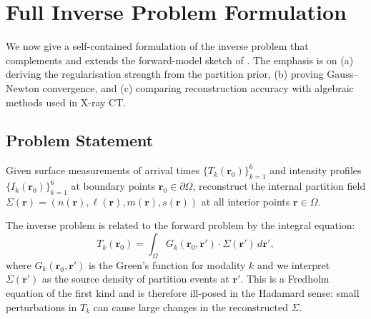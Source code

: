 \section{Full Inverse Problem Formulation}
\label{sec:ch06-inverse-problem}

We now give a self-contained formulation of the inverse problem that
complements and extends the forward-model sketch of .
The emphasis is on (a) deriving the regularisation strength from the partition
prior, (b) proving Gauss--Newton convergence, and (c) comparing reconstruction
accuracy with algebraic methods used in X-ray CT.

\subsection{Problem Statement}
\label{sec:ch06-inverse-statement}

\begin{definition}
\label{def:ch06-inverse-problem}
Given surface measurements of arrival times $\{T_k(\mathbf{r}_0)\}_{k=1}^6$
and intensity profiles $\{I_k(\mathbf{r}_0)\}_{k=1}^6$ at boundary points
$\mathbf{r}_0 \in \partial\Omega$, reconstruct the internal partition field
$\Sigma(\mathbf{r}) = (n(\mathbf{r}), \ell(\mathbf{r}), m(\mathbf{r}),
s(\mathbf{r}))$ at all interior points $\mathbf{r} \in \Omega$.
\end{definition}

The inverse problem is related to the forward problem by the integral equation:
\begin{equation}
  T_k(\mathbf{r}_0)
  = \int_\Omega G_k(\mathbf{r}_0, \mathbf{r}') \cdot \Sigma(\mathbf{r}')\,d\mathbf{r}',
  \label{eq:ch06-forward-integral}
\end{equation}
where $G_k(\mathbf{r}_0,\mathbf{r}')$ is the Green's function for modality $k$
and we interpret $\Sigma(\mathbf{r}')$ as the source density of partition events
at $\mathbf{r}'$.  This is a Fredholm equation of the first kind and is
therefore ill-posed in the Hadamard sense: small perturbations in $T_k$ can
cause large changes in the reconstructed $\Sigma$.

